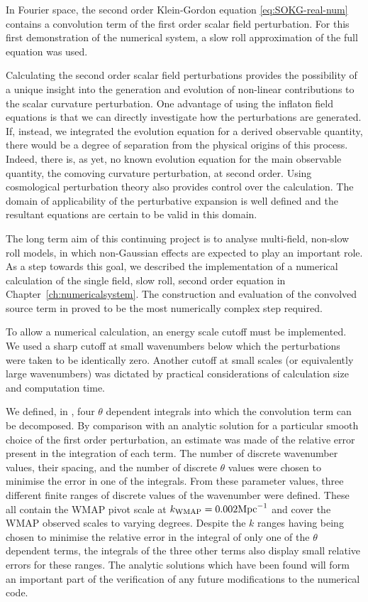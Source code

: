 In Fourier space, the second order Klein-Gordon equation \eqref{eq:SOKG-real-num} contains a
convolution term of the first order scalar field perturbation. For this first
demonstration of the numerical system, a slow roll approximation of the full
equation was used. 


Calculating the second order scalar field perturbations provides the possibility of
a unique insight into the generation and evolution of non-linear contributions to
the scalar curvature perturbation. 
% 
One advantage of using the inflaton field equations is that we can directly
investigate how the perturbations are generated.
If, instead, we integrated the evolution
equation for a derived observable quantity, there would be a degree of
separation from the physical origins of this process. Indeed, there is, as
yet,
no known evolution equation for the main observable quantity, the comoving
curvature perturbation, at second order. 
% 
Using cosmological perturbation theory also provides control over the calculation.
The domain of applicability of the perturbative expansion is well defined and the
resultant equations are certain to be valid in this domain.


The long term aim of this continuing project is
to analyse multi-field, non-slow roll models, in which non-Gaussian effects are
expected to play an important role.
% 
As a step towards this goal, we described the implementation of a numerical
calculation of the single field, slow roll, second order equation in
Chapter~\ref{ch:numericalsystem}. The construction and evaluation of the convolved
source term in  proved to be the most numerically complex
step required. 

To allow a numerical calculation, an energy scale cutoff must be implemented. We used
a sharp cutoff at small wavenumbers below which the perturbations were taken to be
identically zero. Another cutoff at small scales (or equivalently large wavenumbers) was dictated
by practical considerations of calculation size and computation time. 

We defined, in , four $\theta$ dependent integrals
into which the convolution term can be decomposed. By comparison with an analytic
solution for a particular smooth choice of the first order perturbation, an estimate
was made of the relative error present in the integration of each term. The
number of discrete wavenumber values, their spacing, and the number of discrete
$\theta$ values were chosen to minimise the error in one of the integrals. From
these parameter values, three
different finite ranges of discrete values of the wavenumber were defined.
These all contain the WMAP pivot scale at $k_\mathrm{WMAP}=0.002\mathrm{Mpc}^{-1}$ and cover the
WMAP observed scales to varying degrees.
% 
Despite the $k$ ranges having being chosen to minimise the relative error in the
integral of only
one of the $\theta$ dependent terms, the integrals of the three other terms also
display small relative errors for these ranges. 
% 
The analytic solutions which have been found will form an
important part of the verification of any future modifications to the
numerical code. 



